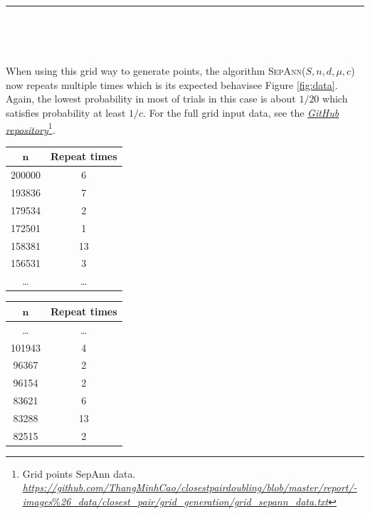 \documentclass[12pt,english,]{article}
\let\origfigure\figure
\let\endorigfigure\endfigure
\renewenvironment{figure}[1][2] {
    \expandafter\origfigure\expandafter[H]
} {
    \endorigfigure
}
\begin{document}
\hrule

~

~

When using this grid way to generate points, the algorithm
\textsc{SepAnn($S,n,d,\mu,c$)} now repeats multiple times which is its
expected behavisee Figure \ref{fig:data}. Again, the lowest probability
in most of trials in this case is about \(1/20\) which satisfies
probability at least \(1/c\). For the full grid input data, see the
\href{https://github.com/ThangMinhCao/closestpairdoubling/blob/master/report/images_\%26_data/closest_pair/grid_generation/grid_sepann_data.txt}{\emph{GitHub
repository}}\footnote{Grid points SepAnn data.
  \href{https://github.com/ThangMinhCao/closestpairdoubling/blob/master/report/images_\%26_data/closest_pair/grid_generation/grid_sepann_data.txt}{\emph{https://github.com/ThangMinhCao/closestpairdoubling/blob/master/report/-}
  \emph{images}\%\emph{26\_data/closest\_pair/grid\_generation/grid\_sepann\_data.txt}}}.

\begin{figure}
\begin{minipage}{0.48\textwidth}
  \centering
  \begin{tabular}{|c|c|}
  \hline
  $\pmb n$   & \textbf{Repeat times} \\ \hline
   200000  & 6            \\ \hline
   193836  & 7            \\ \hline
   179534  & 2            \\ \hline
   172501  & 1            \\ \hline
   158381  & 13           \\ \hline
   156531  & 3            \\ \hline
  \ldots   & \ldots       \\ \hline
  \end{tabular}
\end{minipage}
\begin{minipage}{0.48\textwidth}
  \centering
  \begin{tabular}{|c|c|}
  \hline
  $\pmb n$   & \textbf{Repeat times} \\ \hline
  \ldots   & \ldots       \\ \hline
  101943   & 4            \\ \hline
   96367   & 2            \\ \hline
   96154   & 2            \\ \hline
   83621   & 6            \\ \hline
   83288   & 13           \\ \hline
   82515   & 2            \\ \hline
  \end{tabular}
\end{minipage}
\caption[Caption]{Given an input of 200,000 points generated in a grid. This is a portion of the data about the number of times the algorithm \textsc{SepAnn$(S,n,d,\mu,c)$} repeats.}
\label{fig:data}

\end{figure}
\end{document}
